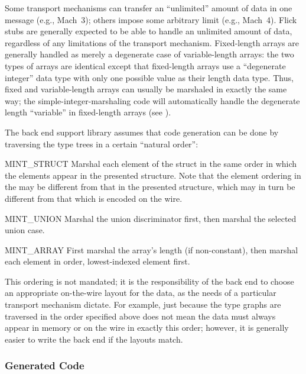 Some transport mechanisms can transfer an ``unlimited'' amount of data in one
message (e.g., Mach~3); others impose some arbitrary limit (e.g., Mach~4).
Flick stubs are generally expected to be able to handle an unlimited amount of
data, regardless of any limitations of the transport mechanism.  Fixed-length
arrays are generally handled as merely a degenerate case of variable-length
arrays: the two types of arrays are identical except that fixed-length arrays
use a ``degenerate integer'' data type with only one possible value as their
length data type.  Thus, fixed and variable-length arrays can usually be
marshaled in exactly the same way; the simple-integer-marshaling code will
automatically handle the degenerate length ``variable'' in fixed-length arrays
(see ).

The back end support library assumes that code generation can be done by
traversing the type trees in a certain ``natural order'':

\begin{cidentifierlist}
  \item[MINT_STRUCT] Marshal each element of the struct in the same order in
  which the elements appear in the presented structure.  Note that the element
  ordering in the  may be different from that in the
  presented structure, which may in turn be different from that which is
  encoded on the wire.

  \item[MINT_UNION] Marshal the union discriminator first, then marshal the
  selected union case.

  \item[MINT_ARRAY] First marshal the array's length (if non-constant), then
  marshal each element in order, lowest-indexed element first.
\end{cidentifierlist}

This ordering is not mandated; it is the responsibility of the back end to
choose an appropriate on-the-wire layout for the data, as the needs of a
particular transport mechanism dictate.  For example, just because the type
graphs are traversed in the order specified above does not mean the data must
always appear in memory or on the wire in exactly this order; however, it is
generally easier to write the back end if the layouts match.

\subsubsection{Generated Code}
\label{subsubsec:BE:Generated Code}

